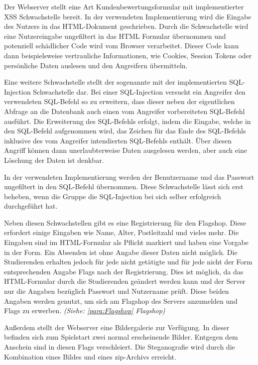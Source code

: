Der Webserver stellt eine Art Kundenbewertungsformular mit implementierter XSS Schwachstelle bereit. In der verwendeten Implementierung wird die Eingabe des Nutzers in das HTML-Dokument geschrieben. Durch die Schwachstelle wird eine Nutzereingabe ungefiltert in das HTML Formular übernommen und potenziell schädlicher Code wird vom Browser verarbeitet. Dieser Code kann dann beispielsweise vertrauliche Informationen, wie Cookies, Session Tokens oder persönliche Daten auslesen und den Angreifern übermitteln. \cite{ruettenSicherheitWebanwendungen2007}

Eine weitere Schwachstelle stellt der sogenannte  mit der implementierten SQL-Injection Schwachstelle dar. 
Bei einer SQL-Injection versucht ein Angreifer den verwendeten SQL-Befehl so zu erweitern, dass dieser neben der eigentlichen Abfrage an die Datenbank auch einen vom Angreifer vorbereiteten SQL-Befehl ausführt. Die Erweiterung des SQL-Befehls erfolgt, indem die Eingabe, welche in den SQL-Befehl aufgenommen wird, das Zeichen für das Ende des SQL-Befehls inklusive des vom Angreifer intendierten SQL-Befehls enthält. Über diesen Angriff können dann unerlaubterweise Daten ausgelesen werden, aber auch eine Löschung der Daten ist denkbar. \cite{bachfeldGiftspritze2004}

In der verwendeten Implementierung werden der Benutzername und das Passwort ungefiltert in den SQL-Befehl übernommen. Diese Schwachstelle lässt sich erst beheben, wenn die Gruppe die SQL-Injection bei sich selber erfolgreich durchgeführt hat.

Neben diesen Schwachstellen gibt es eine Registrierung für den Flagshop. Diese erfordert einige Eingaben wie Name, Alter, Postleitzahl und vieles mehr. Die Eingaben sind im HTML-Formular als Pflicht markiert und haben eine Vorgabe in der Form. Ein Absenden ist ohne Angabe dieser Daten nicht möglich. Die Studierenden erhalten jedoch für jede nicht getätigte und für jede nicht der Form entsprechenden Angabe Flags nach der Registrierung. Dies ist möglich, da das HTML-Formular durch die Studierenden geändert werden kann und der Server nur die Angaben bezüglich Passwort und Nutzername prüft. Diese beiden Angaben werden genutzt, um sich am Flagshop des Servers anzumelden und Flags zu erwerben. \textit{(Siehe: \autoref{para:Flagshop} Flagshop)}

Außerdem stellt der Webserver eine Bildergalerie zur Verfügung. In dieser befinden sich zum Spielstart zwei normal erscheinende Bilder. Entgegen dem Anschein sind in diesen Flags verschleiert. Die Steganografie wird durch die Kombination eines Bildes und eines zip-Archivs erreicht. \cite{abtsUeberarbeitungUndErweiterung2016}